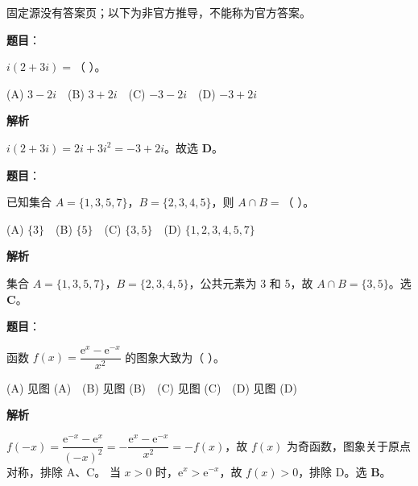 
\begin{gktip}
固定源没有答案页；以下为非官方推导，不能称为官方答案。
\end{gktip}


\begin{answer}

\textbf{题目}：

$i(2+3i)=$（ ）。

(A) $3-2i$　(B) $3+2i$　(C) $-3-2i$　(D) $-3+2i$

\textbf{解析}

$i(2+3i) = 2i+3i^2 = -3+2i$。故选 \textbf{D}。


\end{answer}
\begin{answer}

\textbf{题目}：

已知集合 $A=\{1,3,5,7\}$，$B=\{2,3,4,5\}$，则 $A\cap B=$（ ）。

(A) $\{3\}$　(B) $\{5\}$　(C) $\{3,5\}$　(D) $\{1,2,3,4,5,7\}$

\textbf{解析}

集合 $A=\{1,3,5,7\}$，$B=\{2,3,4,5\}$，公共元素为 3 和 5，故 $A\cap B=\{3,5\}$。选 \textbf{C}。


\end{answer}
\begin{answer}

\textbf{题目}：

函数 $f(x)=\dfrac{\mathrm e^x-\mathrm e^{-x}}{x^2}$ 的图象大致为（ ）。
\nopagebreak[4]
\begin{center}\end{center}
\nopagebreak[4]
(A) 见图 (A)　(B) 见图 (B)　(C) 见图 (C)　(D) 见图 (D)

\textbf{解析}

$f(-x) = \dfrac{\mathrm e^{-x}-\mathrm e^x}{(-x)^2} = -\dfrac{\mathrm e^x-\mathrm e^{-x}}{x^2} = -f(x)$，故 $f(x)$ 为奇函数，图象关于原点对称，排除 A、C。
当 $x>0$ 时，$\mathrm e^x>\mathrm e^{-x}$，故 $f(x)>0$，排除 D。选 \textbf{B}。


\end{answer}
